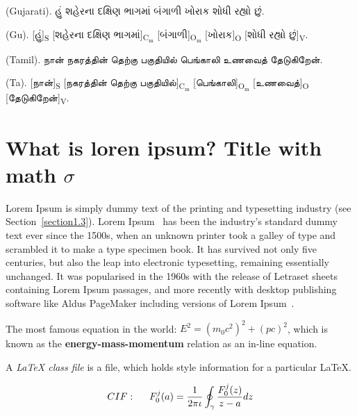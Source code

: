 (Gujarati). \textgujarati{હું શહેરના દક્ષિણ ભાગમાં બંગાળી ખોરાક શોધી રહ્યો છું}.

(Gu). [\textgujarati{હું}]\textsubscript{S} [\textgujarati{શહેરના દક્ષિણ ભાગમાં}]\textsubscript{$\text{C}_\text{m}$} [\textgujarati{બંગાળી}]\textsubscript{$\text{O}_\text{m}$} [\textgujarati{ખોરાક}]\textsubscript{O} [\textgujarati{શોધી રહ્યો છું}]\textsubscript{V}.

(Tamil). \texttamil{நான் நகரத்தின் தெற்கு பகுதியில் பெங்காலி உணவைத் தேடுகிறேன்}.

(Ta). [\texttamil{நான்}]\textsubscript{S} [\texttamil{நகரத்தின் தெற்கு பகுதியில்}]\textsubscript{$\text{C}_\text{m}$} [\texttamil{பெங்காலி}]\textsubscript{$\text{O}_\text{m}$} [\texttamil{உணவைத்}]\textsubscript{O} [\texttamil{தேடுகிறேன்}]\textsubscript{V}.


\section{What is loren ipsum? Title with math \texorpdfstring{$\sigma$}{[sigma]}} %

Lorem Ipsum is simply dummy text of the printing and typesetting industry (see 
Section~\ref{section1.3}). Lorem Ipsum~\citep{Aup91} has been the industry's 
standard dummy text ever since the 1500s, when an unknown printer took a galley 
of type and scrambled it to make a type specimen book. It has survived not only 
five centuries, but also the leap into electronic typesetting, remaining 
essentially unchanged. It was popularised in the 1960s with the release of 
Letraset sheets containing Lorem Ipsum passages, and more recently with desktop 
publishing software like Aldus PageMaker including versions of Lorem 
Ipsum~\citep{AAB95,Con90,LM65}.

The most famous equation in the world: $E^2 = (m_0c^2)^2 + (pc)^2$, which is 
known as the \textbf{energy-mass-momentum} relation as an in-line equation.

A {\em \LaTeX{} class file} is a file, which holds style information for a particular \LaTeX{}.


\begin{align}
CIF: \hspace*{5mm}F_0^j(a) = \frac{1}{2\pi \iota} \oint_{\gamma} \frac{F_0^j(z)}{z - a} dz
\end{align}

